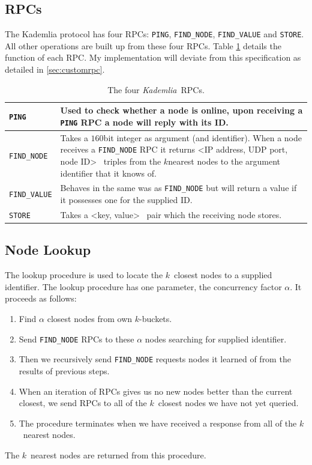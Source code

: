 \documentclass[10pt,twoside,notitlepage,a4paper]{report}
\newcommand{\kademlia}{\emph{Kademlia}}
\newcommand{\K}{$k$}
\begin{document}
	\subsection{RPCs}
	The Kademlia protocol has four RPCs: \texttt{PING}, \texttt{FIND\_NODE}, \texttt{FIND\_VALUE} and \texttt{STORE}. All other operations are built up from these four RPCs. Table \ref{tab:rpcs} details the function of each RPC. My implementation will deviate from this specification as detailed in \cref{sec:customrpc}.
	
	\begin{table}
		\begin{tabularx}{\textwidth}{| l | X |}
			\hline
			\texttt{PING} & Used to check whether a node is online, upon receiving a \texttt{PING} RPC a node will reply with its ID.\\
			\hline
			\texttt{FIND\_NODE} & Takes a $160$bit integer as argument (and identifier). When a node receives a \texttt{FIND\_NODE} RPC it returns \textless IP address, UDP port, node ID\textgreater~ triples from the \K nearest nodes to the argument identifier that it knows of.\\
			\hline
			\texttt{FIND\_VALUE} & Behaves in the same was as \texttt{FIND\_NODE} but will return a value if it possesses one for the supplied ID.\\
			\hline
			\texttt{STORE} & Takes a \textless key, value\textgreater~ pair which the receiving node stores.\\
			\hline
		\end{tabularx}
		\caption{The four \kademlia~RPCs.}
		\label{tab:rpcs}
	\end{table}
	
	\subsection{Node Lookup}
	The lookup procedure is used to locate the \K~closest nodes to a supplied identifier. The lookup procedure has one parameter, the concurrency factor $\alpha$. It proceeds as follows:
	\begin{enumerate}
		\item Find $\alpha$ closest nodes from own \K-buckets.
		\item Send \texttt{FIND\_NODE} RPCs to these $\alpha$ nodes searching for supplied identifier.
		\item Then we recursively send \texttt{FIND\_NODE} requests nodes it learned of from the results of previous steps.
		\item When an iteration of RPCs gives us no new nodes better than the current closest, we send RPCs to all of the \K~closest nodes we have not yet queried.
		\item The procedure terminates when we have received a response from all of the \K~nearest nodes.
	\end{enumerate}
	The \K~nearest nodes are returned from this procedure.
	
\end{document}
